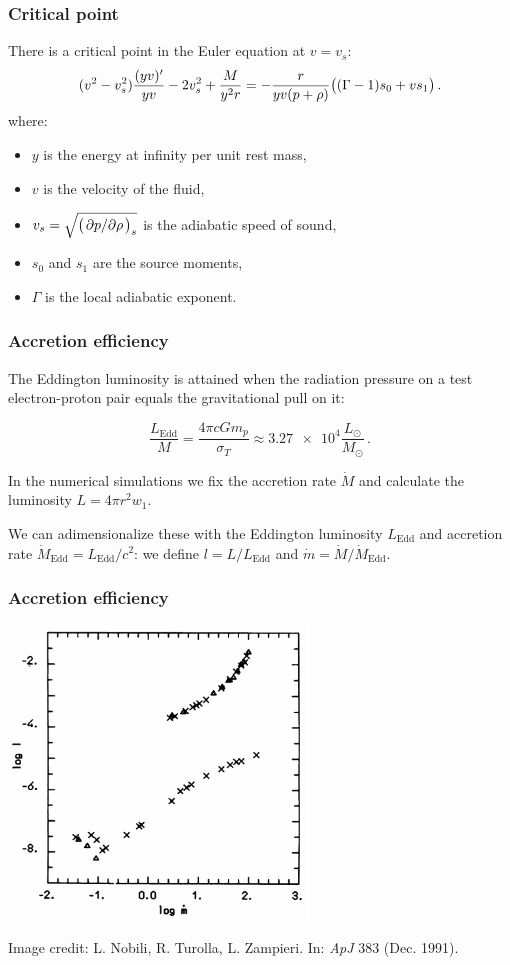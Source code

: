 \documentclass{beamer}
\begin{document}
\begin{frame}
    \frametitle{Critical point}

    There is a critical point in the Euler equation at \(v = v_s\):
        \begin{equation*}
        (v^2 - v_s^2) \frac{(yv) ^{\prime}}{yv} - 2 v_s^2 + \frac{M}{y^2 r}
        = -\frac{r}{yv (p + \rho)} \qty((\Gamma-1)s_0 + v s_1)\,.
        \end{equation*}
    where:
    \begin{itemize}
      \item \(y\) is the energy at infinity per unit rest mass,
      \item \(v\) is the velocity of the fluid,
      \item \(v_s = \sqrt{\qty(\pdv*{p}{\rho})_s}\) is the adiabatic speed of sound,
      \item \(s_0\) and \(s_1\) are the source moments,
      \item \(\Gamma\) is the local adiabatic exponent.
    \end{itemize}

\end{frame}

\begin{frame}
    \frametitle{Accretion efficiency}
    The Eddington luminosity is attained when the radiation pressure on a test electron-proton pair equals the gravitational pull on it:

    \begin{equation*}
        \frac{L_{\text{Edd}}}{M} = \frac{4 \pi c G m_p}{\sigma_T} \approx \num{3.27e4} \frac{L_{\odot}}{M_{\odot}}  \,.
    \end{equation*}

    In the numerical simulations we fix the accretion rate \(\dot{M}\) and calculate the luminosity \(L = 4 \pi r^2 w_1\).

    We can adimensionalize these with the Eddington luminosity \(L_{\text{Edd}}\)  and accretion rate \(\dot{M}_{\text{Edd}} = L_{\text{Edd}} / c^2\):
    we define \(l = L / L_{\text{Edd}}\) and \(\dot{m} = \dot{M} /\dot{M}_{\text{Edd}}\).
\end{frame}

\begin{frame}
    \frametitle{Accretion efficiency}
    \centering
    \includegraphics[width=0.6\textwidth]{../figures/logl-logm}

    {\tiny Image credit: L. Nobili, R. Turolla, L. Zampieri. In: \emph{ApJ} 383 (Dec. 1991).}
\end{frame}
\end{document}
